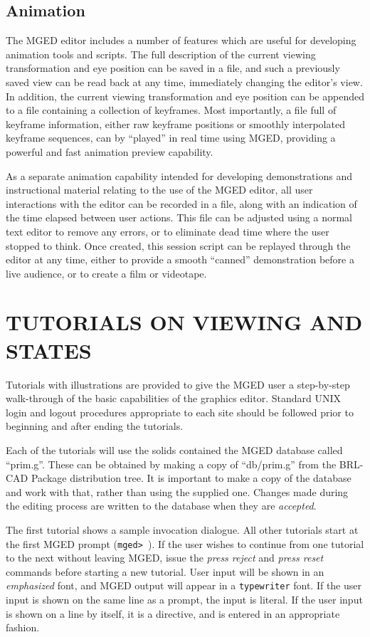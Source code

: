 \section{Animation}

The MGED editor includes a number of features which are useful
for developing animation tools and scripts.
The full description of the current viewing transformation and eye position
can be saved in a file,
and such a previously saved view can be read back at any time,
immediately changing the editor's view.
In addition, the current viewing transformation and eye position can be
appended to a file containing a collection of keyframes.
Most importantly, a file full of keyframe information, either raw keyframe
positions or smoothly interpolated keyframe sequences, can 
by ``played'' in real time using MGED,
providing a powerful and fast animation preview capability.

As a separate animation capability intended
for developing demonstrations and instructional material relating to the
use of the MGED editor,
all user interactions with the editor can be recorded in a file,
along with an indication of the time elapsed between user actions.
This file can be  adjusted using a normal text editor to remove any errors,
or to eliminate dead time where the user stopped to think.
Once created, this session script can be replayed through the editor
at any time, either to provide a smooth ``canned'' demonstration
before a live audience, or to create a film or videotape.
\chapter{TUTORIALS ON VIEWING AND STATES}

Tutorials with illustrations are provided to give the MGED user a
step-by-step walk-through of the basic capabilities of the graphics
editor.
Standard UNIX login and logout procedures appropriate to each site
should be followed prior to
beginning and after ending the tutorials.

Each of the tutorials will use the solids contained the MGED database called
``prim.g''.
These can be obtained by making a copy of ``db/prim.g''
from the BRL-CAD Package distribution tree.  It is important to make
a copy of the database and work with that, rather than using the
supplied one.  Changes made during the editing process are written
to the database when they are {\sl accepted}.

The first tutorial shows a sample invocation dialogue.  All other
tutorials start at the first MGED prompt ({\tt mged> }). If the user
wishes to continue from one tutorial to the next without leaving MGED,
issue the {\em press reject} and {\em press reset} commands
before starting a new tutorial.
User input will be shown in an
{\em emphasized} font, and MGED output will appear in a {\tt typewriter}
font.  If the user input is shown on the same line as a prompt, the
input is literal.  If the user input is shown on a line by itself,
it is a directive, and is entered in an appropriate fashion.

